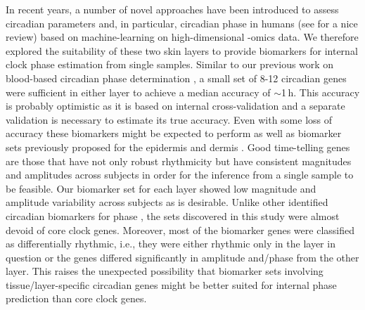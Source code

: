 
In recent years, a number of novel approaches have been introduced to assess circadian parameters and, in particular, circadian phase in humans (see \cite{Dijk2020} for a nice review) based on machine-learning on high-dimensional -omics data. We therefore explored the suitability of these two skin layers to provide biomarkers for internal clock phase estimation from single samples. Similar to our previous work on blood-based circadian phase determination \cite{Wittenbrink2018}, a small set of 8-12 circadian genes were sufficient in either layer to achieve a median accuracy of $\sim$1\,h. This accuracy is probably optimistic as it is based on internal cross-validation and a separate validation is necessary to estimate its true accuracy. Even with some loss of accuracy these biomarkers might be expected to perform as well as biomarker sets previously proposed for the epidermis and dermis \cite{Wu2018, Wu2020}. Good time-telling genes are those that have not only robust rhythmicity but have consistent magnitudes and amplitudes across subjects in order for the inference from a single sample to be feasible. Our biomarker set for each layer showed low magnitude and amplitude variability across subjects as is desirable. Unlike other identified circadian biomarkers for phase \cite{Wu2018, Wu2020,Laing2017,Wittenbrink2018}, the sets discovered in this study were almost devoid of core clock genes. Moreover, most of the biomarker genes were classified as differentially rhythmic, i.e., they were either rhythmic only in the layer in question or the genes differed significantly in amplitude and/phase from the other layer. This raises the unexpected possibility that biomarker sets involving tissue/layer-specific circadian genes might be better suited for internal phase prediction than core clock genes.

